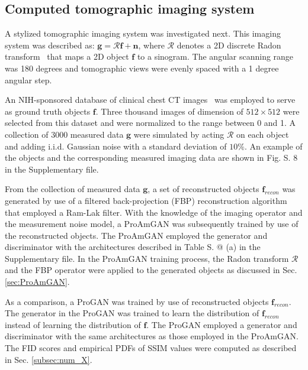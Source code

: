 \documentclass[journal]{IEEEtran}
\makeatletter
\renewcommand{\vec}[1]{\mathbf{#1}}
\newcommand*{\rom}[1]{\expandafter\@slowromancap\romannumeral #1@}
\makeatother
\begin{document}
\subsection{Computed tomographic imaging system} 
A stylized tomographic imaging system was investigated next. 
This imaging system was described as: $\vec{g} = \mathcal{R}\vec{f} + \vec{n}$, 
where $\mathcal{R}$ denotes a 2D discrete Radon transform~\cite{kak2002principles} that maps a 2D object $\vec{f}$
 to a sinogram. The angular scanning range was 180 degrees and tomographic views were evenly
spaced  with a 1 degree angular step.

An NIH-sponsored database of clinical chest CT images~\cite{yan2018deeplesion} was employed to serve as ground truth objects $\vec{f}$. Three thousand images of dimension of $512\times 512$ were selected from this dataset and were normalized to the range between 0 and 1. 
A collection of 3000 measured data $\vec{g}$ were simulated by acting $\mathcal{R}$ on each object and adding i.i.d. Gaussian noise with a standard deviation of $10\%$. 
An example of the objects and the corresponding measured imaging data are shown in Fig. S. 8 in the Supplementary file.
  
From the collection of measured data $\vec{g}$, 
a set of reconstructed objects  $\vec{f}_{recon}$ was generated by
use of a filtered back-projection (FBP) reconstruction algorithm that employed a Ram-Lak filter.
With the knowledge of the imaging operator and the measurement noise model,
a ProAmGAN was subsequently trained 
by use of the reconstructed objects. 
 The ProAmGAN employed the generator and discriminator with the architectures described in Table S. \rom{1} (a) in the Supplementary file. 
 In the ProAmGAN training process, the Radon transform $\mathcal{R}$ and the FBP operator were applied to the generated objects as discussed in Sec. \ref{sec:ProAmGAN}.
 
{As a comparison,
a ProGAN was trained by use of reconstructed objects $\vec{f}_{recon}$.
The generator in the ProGAN was trained to learn the distribution of $\vec{f}_{recon}$ instead of learning the distribution of $\vec{f}$. The ProGAN employed a generator and discriminator with the same architectures as those employed in the ProAmGAN.
The FID scores and empirical PDFs of SSIM values were computed as described in Sec. \ref{subsec:num_X}.}
\end{document}
